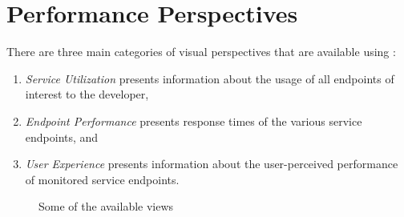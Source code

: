 \documentclass{sig-alternate-05-2015}
\begin{document}
\section{Performance Perspectives}
\label{sec:views}

  There are three main categories of visual perspectives that are available using \tool:
  \begin{enumerate}
    \item \textit{Service Utilization} presents information about the usage of all endpoints of interest to the developer,
    \item \textit{Endpoint Performance} presents response times of the various service endpoints, and
    \item \textit{User Experience} presents information about the user-perceived performance of monitored service endpoints.
  \end{enumerate}




\begin{figure}[t]
	\centering
	\qquad
	\qquad
	\caption{Some of the available views\label{fig:views}}
\end{figure}
\end{document}

